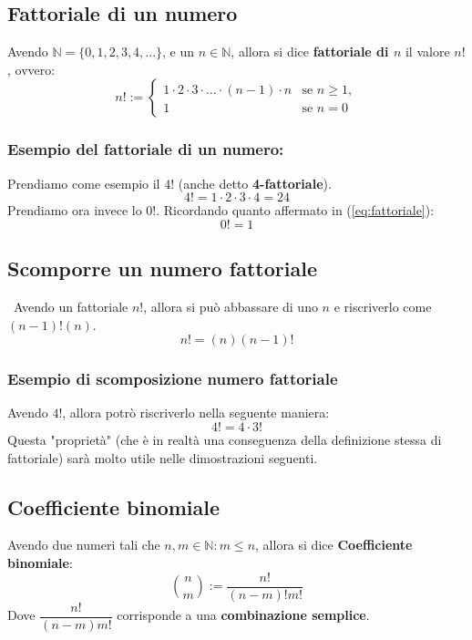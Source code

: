 \documentclass[12pt]{article}
\begin{document}
\subsection{Fattoriale di un numero}
Avendo $\mathbb{N} = \{0, 1, 2, 3, 4, ...\}$, e un $n \in \mathbb{N}$, allora si dice \textbf{fattoriale di $n$} il valore $n!$, ovvero:
\begin{equation}
    n! := 
    \begin{cases} 
        1 \cdot 2 \cdot 3 \cdot \dots \cdot (n-1) \cdot n & \text{se } n \geq 1, \\
        1 & \text{se } n = 0 
        \label{eq:fattoriale}
    \end{cases}
\end{equation}
\subsubsection{Esempio del fattoriale di un numero:}
Prendiamo come esempio il $4!$ (anche detto \textbf{4-fattoriale}).
\[4! = 1 \cdot 2 \cdot 3 \cdot 4 = 24\]
Prendiamo ora invece lo $0!$. Ricordando quanto affermato in (\ref{eq:fattoriale}):
\[0! = 1\]
\subsection{Scomporre un numero fattoriale}\
Avendo un fattoriale $n!$, allora si può abbassare di uno $n$ e riscriverlo come $(n-1)!(n)$.
\begin{equation}
    n! = (n)(n-1)! \label{eq:scompos_fattoriale}
\end{equation} 
\subsubsection{Esempio di scomposizione numero fattoriale}
Avendo $4!$, allora potrò riscriverlo nella seguente maniera:
\[
    4! = 4 \cdot 3!
\]
Questa "proprietà" (che è in realtà una conseguenza della definizione stessa di fattoriale) sarà molto utile nelle dimostrazioni seguenti.
\subsection{Coefficiente binomiale}
Avendo due numeri tali che $n, m \in \mathbb{N} : m \leq n$, allora si dice \textbf{Coefficiente binomiale}:
\begin{equation}
    \binom{n}{m} := \dfrac{n!}{(n-m)!m!} \label{eq:coefficiente_binomiale}
\end{equation}
Dove $\dfrac{n!}{(n-m)m!}$ corrisponde a una \textbf{combinazione semplice}.
\end{document}
